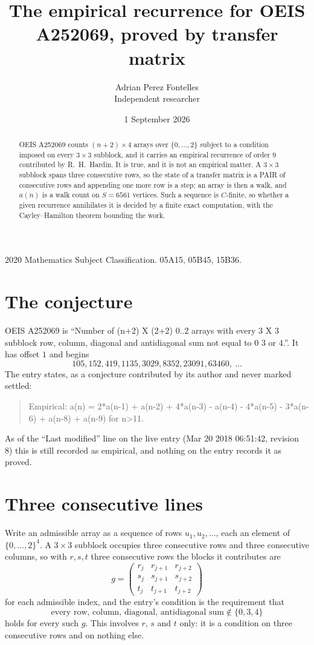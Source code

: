\documentclass[11pt,a4paper]{article}
\title{The empirical recurrence for OEIS A252069, proved by transfer matrix}
\author{Adrian Perez Fontelles\\ \small Independent researcher}
\date{1 September 2026}
\theoremstyle{plain}
\theoremstyle{definition}
\begin{document}
\maketitle

\begin{abstract}
OEIS A252069 counts $(n+2)\times4$ arrays over $\{0,\dots,2\}$ subject to a condition imposed on
every $3\times3$ subblock, and it carries an empirical recurrence of order $9$
contributed by R.~H.~Hardin. It is true, and it is not an empirical matter. A $3\times3$
subblock spans three consecutive rows, so the state of a transfer matrix is a PAIR of
consecutive rows and appending one more row is a step; an array is then a walk, and
$a(n)$ is a walk count on $S=6561$ vertices. Such a sequence is $C$-finite, so whether a given
recurrence annihilates it is decided by a finite exact computation, with the Cayley--Hamilton
theorem bounding the work.
\end{abstract}

\noindent\small 2020 Mathematics Subject Classification. 05A15, 05B45, 15B36.\normalsize

\section{The conjecture}

OEIS A252069 is ``Number of (n+2) X (2+2) 0..2 arrays with every 3 X 3 subblock row, column, diagonal and antidiagonal sum not equal to 0 3 or 4.''. It has offset $1$ and begins
\[
105, 152, 419, 1135, 3029, 8352, 23091, 63460,\ \dots
\]
The entry states, as a conjecture contributed by its author and never marked settled:
\begin{quote}
Empirical: a(n) = 2*a(n-1) + a(n-2) + 4*a(n-3) - a(n-4) - 4*a(n-5) - 3*a(n-6) + a(n-8) + a(n-9) for n>11.
\end{quote}
As of the ``Last modified'' line on the live entry (Mar 20 2018 06:51:42, revision 8) this is still
recorded as empirical, and nothing on the entry records it as proved.

\section{Three consecutive lines}

Write an admissible array as a sequence of rows $u_1,u_2,\dots$, each an element of
$\{0,\dots,2\}^{4}$. A $3\times3$ subblock occupies three consecutive rows and
three consecutive columns, so with $r,s,t$ three consecutive rows the blocks it
contributes are
\[
g=\begin{pmatrix}r_j&r_{j+1}&r_{j+2}\\ s_j&s_{j+1}&s_{j+2}\\ t_j&t_{j+1}&t_{j+2}\end{pmatrix}
\]
for each admissible index, and the entry's condition is the requirement that
\[
\text{every row, column, diagonal, antidiagonal sum} \notin \{0,3,4\}
\]
holds for every such $g$. This involves $r$, $s$ and $t$ only: it is a condition on
three consecutive rows and on nothing else.
\end{document}
